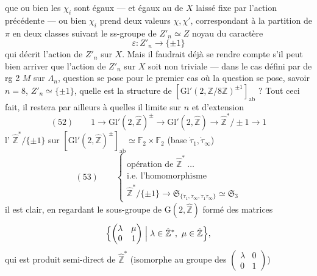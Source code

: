 \documentclass[11pt,a4paper]{article}
\begin{document}
que ou bien les $\chi_i$ sont égaux — et égaux  au   de $X$ laissé fixe par l'action précédente — ou bien $\chi_i$ prend deux valeurs $\chi, \chi'$, correspondant à \struck{\ill{}} la partition de $\pi$ en deux classes suivant le \struck{\ill{}} ss-groupe de $Z'_n \simeq Z$ noyau du caractère
\[
\varepsilon : Z'_n \longrightarrow \{\pm 1\}
\]
qui décrit l'action de $Z'_n$ sur $X$. Mais il faudrait déjà se rendre compte s'il peut bien arriver que l'action de $Z'_n$ sur $X$ soit non triviale — dans le cas \uncertain{\ill{}} défini par \ill{} \ill{} de rg 2 $M$ sur $\Lambda_n$, \ill{} question se pose \ill{} pour le premier cas où la question se pose, savoir $n = 8$, $Z'_n \simeq \{\pm 1\}$, quelle est la structure de $[\mathrm{Gl}'(2, \mathbb{Z}/8\mathbb{Z})^{\pm 1}]_{\mathrm{ab}}$ ? Tout ceci fait, il restera par ailleurs à \ill{} quelles \ill{} \ill{} \ill{} \ill{} il limite sur $n$ et \ill{}   d'extension
\[
(52) \qquad 1 \longrightarrow \mathrm{Gl}'(2, \hat{\mathbb{Z}})^{\pm} \longrightarrow \mathrm{Gl}'(2, \hat{\mathbb{Z}}) \longrightarrow \hat{\mathbb{Z}}^{*}/\pm 1 \longrightarrow 1
\]
l'  $\hat{\mathbb{Z}}^{*}/\{\pm 1\}$ sur $[\mathrm{Gl}'(2, \hat{\mathbb{Z}})^{\pm}]_{\mathrm{ab}} \simeq \mathbb{F}_2 \times \mathbb{F}_2$ (base $\dot\tau_1, \dot\tau_\infty$)
\[
(53) \qquad \begin{cases} \text{opération de } \hat{\mathbb{Z}}^{*} \ \ldots \\ \text{i.e.\ l'homomorphisme} \\ \hat{\mathbb{Z}}^{*}/\{\pm 1\} \longrightarrow \mathfrak{S}_{\{\dot\tau_1, \dot\tau_\infty, \dot\tau_1\dot\tau_\infty\}} \simeq \mathfrak{S}_3 \end{cases}
\]
il est clair, en regardant le sous-groupe de $\mathrm{G}(2, \hat{\mathbb{Z}})$ formé des matrices
\[
\Bigl\{ \begin{pmatrix} \lambda & \mu \\ 0 & 1 \end{pmatrix} \Bigm| \lambda \in \hat{\mathbb{Z}}^{*},\ \mu \in \hat{\mathbb{Z}} \Bigr\},
\]
qui est produit semi-direct de $\hat{\mathbb{Z}}^{*}$ (isomorphe au groupe des $\begin{pmatrix} \lambda & 0 \\ 0 & 1 \end{pmatrix}$)
\end{document}
